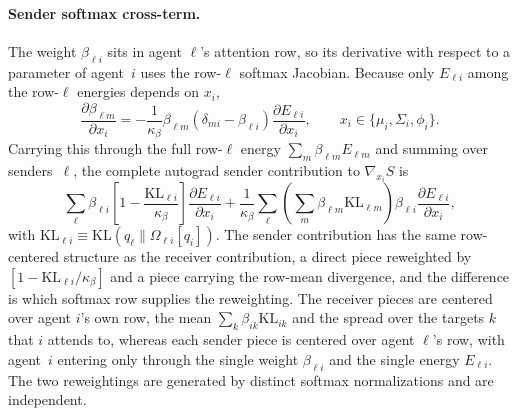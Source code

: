 \documentclass[11pt]{article}
\begin{document}
\paragraph{Sender softmax cross-term.}
The weight $\beta_{\ell i}$ sits in agent $\ell$'s attention row, so its derivative with respect to a parameter of agent~$i$ uses the row-$\ell$ softmax Jacobian. Because only $E_{\ell i}$ among the row-$\ell$ energies depends on $x_i$,
\begin{equation}
\frac{\partial \beta_{\ell m}}{\partial x_i} = -\frac{1}{\kappa_\beta}\beta_{\ell m}\left(\delta_{mi} - \beta_{\ell i}\right)\frac{\partial E_{\ell i}}{\partial x_i}, \qquad x_i \in \{\mu_i, \Sigma_i, \phi_i\}.
\label{eq:sender_softmax_entry}
\end{equation}
Carrying this through the full row-$\ell$ energy $\sum_m \beta_{\ell m}E_{\ell m}$ and summing over senders~$\ell$, the complete autograd sender contribution to $\nabla_{x_i}S$ is
\begin{equation}
\sum_\ell \beta_{\ell i}\left[1 - \frac{\mathrm{KL}_{\ell i}}{\kappa_\beta}\right]\frac{\partial E_{\ell i}}{\partial x_i} + \frac{1}{\kappa_\beta}\sum_\ell \left(\sum_m \beta_{\ell m}\mathrm{KL}_{\ell m}\right)\beta_{\ell i}\frac{\partial E_{\ell i}}{\partial x_i},
\label{eq:sender_autograd}
\end{equation}
with $\mathrm{KL}_{\ell i} \equiv \mathrm{KL}(q_\ell \| \Omega_{\ell i}[q_i])$. The sender contribution has the same row-centered structure as the receiver contribution, a direct piece reweighted by $[1 - \mathrm{KL}_{\ell i}/\kappa_\beta]$ and a piece carrying the row-mean divergence, and the difference is which softmax row supplies the reweighting. The receiver pieces are centered over agent $i$'s own row, the mean $\sum_k \beta_{ik}\mathrm{KL}_{ik}$ and the spread over the targets $k$ that $i$ attends to, whereas each sender piece is centered over agent $\ell$'s row, with agent~$i$ entering only through the single weight $\beta_{\ell i}$ and the single energy $E_{\ell i}$. The two reweightings are generated by distinct softmax normalizations and are independent.
\end{document}

